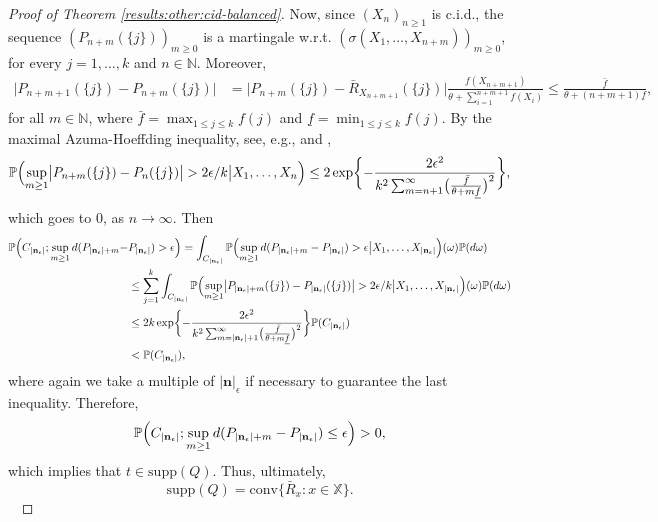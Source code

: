 \documentclass[a4paper]{article}
\theoremstyle{plain}
\theoremstyle{remark}
\theoremstyle{definition}
\begin{document}
\begin{proof}[Proof of Theorem \ref{results:other:cid-balanced}]
Now, since $(X_n)_{n\geq1}$ is c.i.d., the sequence $(P_{n+m}(\{j\}))_{m\geq0}$ is a martingale w.r.t. $(\sigma(X_1,\ldots,X_{n+m}))_{m\geq0}$, for every $j=1,\ldots,k$ and $n\in\mathbb{N}$. Moreover, 
\begingroup\allowdisplaybreaks
\begin{align*}
\bigl|P_{n+m+1}(\{j\})-P_{n+m}(\{j\})\bigr|&=\bigl|P_{n+m}(\{j\})-\bar{R}_{X_{n+m+1}}(\{j\})\bigr|\frac{f(X_{n+m+1})}{\theta+\sum_{i=1}^{n+m+1}f(X_i)}\leq\frac{\bar{f}}{\theta+(n+m+1)\underline{f}},
\end{align*}
\endgroup
for all $m\in\mathbb{N}$, where $\bar{f}=\max_{1\leq j\leq k}f(j)$ and $\underline{f}=\min_{1\leq j\leq k}f(j)$. By the maximal Azuma-Hoeffding inequality, see, e.g., \cite[][Corollary 6.9 and Section 6(c)]{mcdiarmid1989} and \cite{roch2022},
\[\mathbb{P}\Bigl(\sup_{m\geq1}\bigl|P_{n+m}(\{j\})-P_n(\{j\})\bigr|>2\epsilon/k\bigr| X_1,\ldots,X_n\Bigr)\leq2\exp\biggl\{-\frac{2\epsilon^2}{k^2\sum_{m=n+1}^\infty\bigl(\frac{\bar{f}}{\theta+m\underline{f}}\bigr)^2}\biggr\},\]
which goes to $0$, as $n\rightarrow\infty$. Then
\begingroup\allowdisplaybreaks
\begin{align*}
\mathbb{P}\Bigl(C_{|\textbf{n}_\epsilon|};\sup_{m\geq1}d(P_{{|\textbf{n}_\epsilon|}+m}-&P_{|\textbf{n}_\epsilon|})>\epsilon\Bigr)=\int_{C_{|\textbf{n}_\epsilon|}}\mathbb{P}\Bigl(\sup_{m\geq1}d(P_{{|\textbf{n}_\epsilon|}+m}-P_{|\textbf{n}_\epsilon|})>\epsilon\bigr|X_1,\ldots,X_{|\textbf{n}_\epsilon|}\Bigr)(\omega)\mathbb{P}(d\omega)\\
&\leq\sum_{j=1}^k\int_{C_{|\textbf{n}_\epsilon|}}\mathbb{P}\Bigl(\sup_{m\geq1}\bigl|P_{{|\textbf{n}_\epsilon|}+m}(\{j\})-P_{|\textbf{n}_\epsilon|}(\{j\})\bigr|>2\epsilon/k\bigr| X_1,\ldots,X_{|\textbf{n}_\epsilon|}\Bigr)(\omega)\mathbb{P}(d\omega)\\
&\leq 2k\exp\biggl\{-\frac{2\epsilon^2}{k^2\sum_{m={|\textbf{n}_\epsilon|}+1}^\infty\bigl(\frac{\bar{f}}{\theta+m\underline{f}}\bigr)^2}\biggr\}\mathbb{P}(C_{|\textbf{n}_\epsilon|})\\
&<\mathbb{P}(C_{|\textbf{n}_\epsilon|}),
\end{align*}
\endgroup
where again we take a multiple of $|\textbf{n}|_\epsilon$ if necessary to guarantee the last inequality. Therefore,
\[\mathbb{P}\Bigl(C_{|\textbf{n}_\epsilon|};\sup_{m\geq1}d(P_{{|\textbf{n}_\epsilon|}+m}-P_{|\textbf{n}_\epsilon|})\leq\epsilon\Bigr)>0,\]
which implies that $t\in\mbox{supp}(Q)$. Thus, ultimately,
\begin{equation}\label{proof:results:other:cid-balanced:eq3}
\mbox{supp}(Q)=\mbox{conv}\{\bar{R}_x:x\in\mathbb{X}\}.
\end{equation}~ 


\end{proof}
\end{document}
